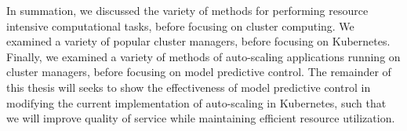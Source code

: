 In summation, we discussed the variety of methods for performing resource intensive
computational tasks, before focusing on cluster computing. We examined a variety
of popular cluster managers, before focusing on Kubernetes. Finally, we examined
a variety of methods of auto-scaling applications running on cluster managers,
before focusing on model predictive control. The remainder of this thesis will
seeks to show the effectiveness of model predictive control in modifying the
current implementation of auto-scaling in Kubernetes, such that we will improve
quality of service while maintaining efficient resource utilization.

